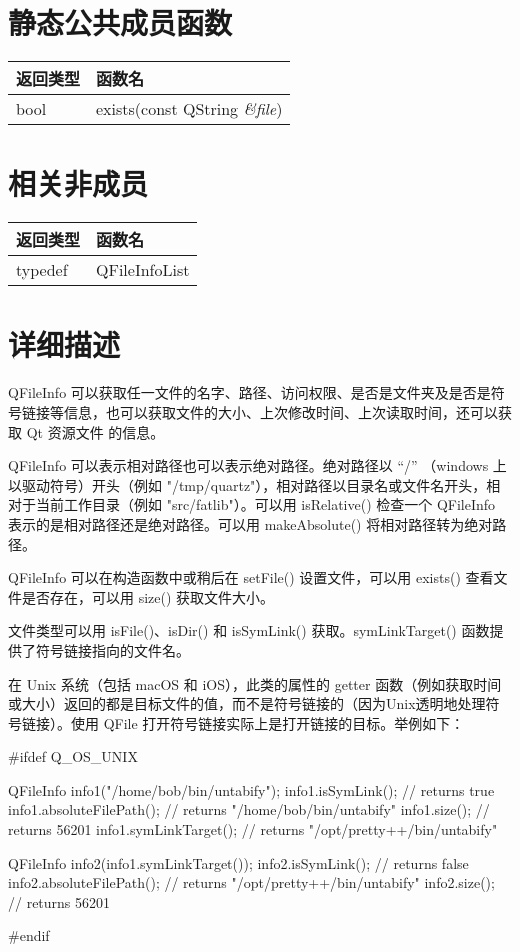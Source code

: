 \section{静态公共成员函数}

\begin{tabular}{|l|l|}
\hline
返回类型 &	函数名\\
\hline
bool &	exists(const QString \emph{\&file})\\
\hline
\end{tabular}


\section{相关非成员}

\begin{tabular}{|l|l|}
\hline
返回类型& 	函数名\\
\hline
typedef &	QFileInfoList\\
\hline
\end{tabular}

\splitLine 

\section{详细描述}

QFileInfo 可以获取任一文件的名字、路径、访问权限、是否是文件夹及是否是符号链接等信息，也可以获取文件的大小、上次修改时间、上次读取时间，还可以获取 Qt 资源文件 的信息。

QFileInfo 可以表示相对路径也可以表示绝对路径。绝对路径以 “/” （windows 上以驱动符号）开头（例如 "/tmp/quartz"），相对路径以目录名或文件名开头，相对于当前工作目录（例如 "src/fatlib"）。可以用 isRelative() 检查一个 QFileInfo 表示的是相对路径还是绝对路径。可以用 makeAbsolute() 将相对路径转为绝对路径。

QFileInfo 可以在构造函数中或稍后在 setFile() 设置文件，可以用 exists() 查看文件是否存在，可以用 size() 获取文件大小。

文件类型可以用 isFile()、isDir() 和 isSymLink() 获取。symLinkTarget() 函数提供了符号链接指向的文件名。

在 Unix 系统（包括 macOS 和 iOS），此类的属性的 getter 函数（例如获取时间或大小）返回的都是目标文件的值，而不是符号链接的（因为Unix透明地处理符号链接）。使用 QFile 打开符号链接实际上是打开链接的目标。举例如下：


\begin{cppcode}
#ifdef Q_OS_UNIX

QFileInfo info1("/home/bob/bin/untabify");
info1.isSymLink();          // returns true
info1.absoluteFilePath();   // returns "/home/bob/bin/untabify"
info1.size();               // returns 56201
info1.symLinkTarget();      // returns "/opt/pretty++/bin/untabify"

QFileInfo info2(info1.symLinkTarget());
info2.isSymLink();          // returns false
info2.absoluteFilePath();   // returns "/opt/pretty++/bin/untabify"
info2.size();               // returns 56201

#endif
\end{cppcode}

